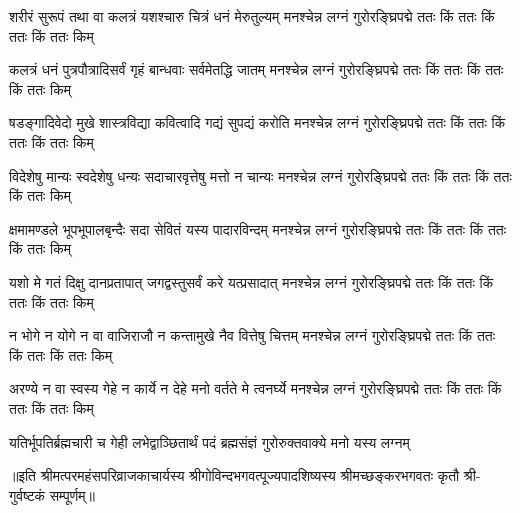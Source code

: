 

\fourlineindentedshloka
{शरीरं सुरूपं तथा वा कलत्रं}
{यशश्चारु चित्रं धनं मेरुतुल्यम्}
{मनश्चेन्न लग्नं गुरोरङ्घ्रिपद्मे}
{ततः किं ततः किं ततः किं ततः किम्}%
 

 \fourlineindentedshloka
{कलत्रं धनं पुत्रपौत्रादिसर्वं}
{गृहं बान्धवाः सर्वमेतद्धि जातम्}
{मनश्चेन्न लग्नं गुरोरङ्घ्रिपद्मे}
{ततः किं ततः किं ततः किं ततः किम्}%
 

\fourlineindentedshloka 
{षडङ्गादिवेदो मुखे शास्त्रविद्या}
{कवित्वादि गद्यं सुपद्यं करोति}
{मनश्चेन्न लग्नं गुरोरङ्घ्रिपद्मे}
{ततः किं ततः किं ततः किं ततः किम्}%
 

\fourlineindentedshloka 
{विदेशेषु मान्यः स्वदेशेषु धन्यः}
{सदाचारवृत्तेषु मत्तो न चान्यः}
{मनश्चेन्न लग्नं गुरोरङ्घ्रिपद्मे}
{ततः किं ततः किं ततः किं ततः किम्}%
 

\fourlineindentedshloka 
{क्षमामण्डले भूपभूपालबृन्दैः}
{सदा सेवितं यस्य पादारविन्दम्}
{मनश्चेन्न लग्नं गुरोरङ्घ्रिपद्मे}
{ततः किं ततः किं ततः किं ततः किम्}%
 
\fourlineindentedshloka 
{यशो मे गतं दिक्षु दानप्रतापात्}
{जगद्वस्तुसर्वं करे यत्प्रसादात्}
{मनश्चेन्न लग्नं गुरोरङ्घ्रिपद्मे}
{ततः किं ततः किं ततः किं ततः किम्}%
 
\fourlineindentedshloka 
{न भोगे न योगे न वा वाजिराजौ}
{न कन्तामुखे नैव वित्तेषु चित्तम्}
{मनश्चेन्न लग्नं गुरोरङ्घ्रिपद्मे}
{ततः किं ततः किं ततः किं ततः किम्}%
 

\fourlineindentedshloka 
{अरण्ये न वा स्वस्य गेहे न कार्ये}
{न देहे मनो वर्तते मे त्वनर्घ्ये}
{मनश्चेन्न लग्नं गुरोरङ्घ्रिपद्मे}
{ततः किं ततः किं ततः किं ततः किम्}%
 

{यतिर्भूपतिर्ब्रह्मचारी च गेही}
{लभेद्वाञ्छितार्थं पदं ब्रह्मसंज्ञं}
{गुरोरुक्तवाक्ये मनो यस्य लग्नम्}%
 

॥इति श्रीमत्परमहंसपरिव्राजकाचार्यस्य श्रीगोविन्दभगवत्पूज्यपादशिष्यस्य 
श्रीमच्छङ्करभगवतः कृतौ श्री-गुर्वष्टकं सम्पूर्णम्॥
